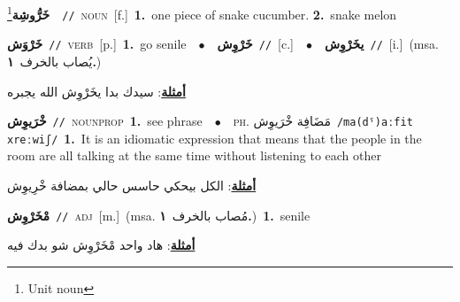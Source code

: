 \documentclass[10pt,a4paper,twoside]{article} %
\begin{document}
\begin{multicols}{2}
{\setlength\topsep{0pt}\textbf{\foreignlanguage{arabic}{خَرُّوشِة}}\footnote{Unit noun}\ \ {\color{gray}\texttt{//}\color{black}}\ \textsc{noun}\ [f.]\ \textbf{1.}~one piece of snake cucumber.  \textbf{2.}~snake melon\ } \vspace{2mm}

{\setlength\topsep{0pt}\textbf{\foreignlanguage{arabic}{خَرْوَش}}\ {\color{gray}\texttt{//}\color{black}}\ \textsc{verb}\ [p.]\ \textbf{1.}~go senile\ \ $\bullet$\ \ \setlength\topsep{0pt}\textbf{\foreignlanguage{arabic}{خَرْوِش}}\ {\color{gray}\texttt{//}\color{black}}\ [c.]\ \ $\bullet$\ \ \setlength\topsep{0pt}\textbf{\foreignlanguage{arabic}{يخَرْوِش}}\ {\color{gray}\texttt{//}\color{black}}\ [i.]\ \color{gray}(msa. \foreignlanguage{arabic}{يُصاب بالخرف}~\foreignlanguage{arabic}{\textbf{١.}})\color{black}\  \begin{flushright}\color{gray}\foreignlanguage{arabic}{\textbf{\underline{\foreignlanguage{arabic}{أمثلة}}}: سيدك بدا يخَرْوِش الله يجبره}\end{flushright}\color{black}} \vspace{2mm}

{\setlength\topsep{0pt}\textbf{\foreignlanguage{arabic}{خْرَيوِش}}\ {\color{gray}\texttt{//}\color{black}}\ \textsc{noun\textunderscore prop}\ \textbf{1.}~see phrase\ \ $\bullet$\ \ \textsc{ph.} \color{gray} \foreignlanguage{arabic}{مَضَافِة خْرَيوِش}\color{black}\ {\color{gray}\texttt{/{\sffamily ma(dˤ)aːfit xreːwiʃ}/}\color{black}}\ \textbf{1.}~It is an idiomatic expression that means that the people in the room are all talking at the same time without listening to each other\  \begin{flushright}\color{gray}\foreignlanguage{arabic}{\textbf{\underline{\foreignlanguage{arabic}{أمثلة}}}: الكل بيحكي حاسس حالي بمضافة خْرِيوِش}\end{flushright}\color{black}} \vspace{2mm}

{\setlength\topsep{0pt}\textbf{\foreignlanguage{arabic}{مْخَرْوِش}}\ {\color{gray}\texttt{//}\color{black}}\ \textsc{adj}\ [m.]\ \color{gray}(msa. \foreignlanguage{arabic}{مُصاب بالخرف}~\foreignlanguage{arabic}{\textbf{١.}})\color{black}\ \textbf{1.}~senile\  \begin{flushright}\color{gray}\foreignlanguage{arabic}{\textbf{\underline{\foreignlanguage{arabic}{أمثلة}}}: هاد واحد مْخَرْوِش شو بدك فيه}\end{flushright}\color{black}} \vspace{2mm}


\end{multicols}
\end{document}
